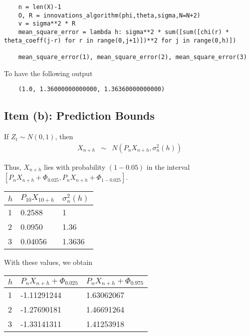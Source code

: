 \begin{verbatim}
    n = len(X)-1
    O, R = innovations_algorithm(phi,theta,sigma,N=N+2)
    v = sigma**2 * R
    mean_square_error = lambda h: sigma**2 * sum([sum([chi(r) * theta_coeff(j-r) for r in range(0,j+1)])**2 for j in range(0,h)])

    mean_square_error(1), mean_square_error(2), mean_square_error(3) 
\end{verbatim}
To have the following output
\begin{verbatim}
    (1.0, 1.36000000000000, 1.36360000000000)
\end{verbatim}

\subsection*{Item (b): Prediction Bounds}

If $Z_t \sim N(0,1)$, then
\[ \begin{array}{rcl}
    X_{n+h} & \sim & N(P_{n} X_{n+h}, \sigma_n^2(h))
\end{array} \]

Thus, $X_{n+h}$ lies with probability $(1-0.05)$ in the interval $[P_n X_{n+h}+\Phi_{0.025}, P_n X_{n+h}+ \Phi_{1-0.025}]$.

\begin{table}[H]\centering
    \begin{tabular}{l|ll}
    $h$ & $P_{10} X_{10+h}$ & $\sigma_n^2(h)$ \\ \hline
    1   & 0.2588            & 1               \\
    2   & 0.0950            & 1.36            \\
    3   & 0.04056           & 1.3636         
    \end{tabular}
\end{table}

With these values, we obtain

\begin{table}[H]\centering
    \begin{tabular}{l|ll}
    $h$ & $P_n X_{n+h}+\Phi_{0.025}$ & $P_n X_{n+h}+\Phi_{0.975}$ \\ \hline
    1   & -1.11291244            & 1.63062067              \\
    2   & -1.27690181            & 1.46691264            \\
    3   & -1.33141311           & 1.41253918         
    \end{tabular}
\end{table}

